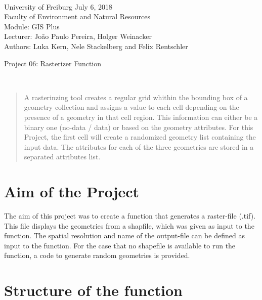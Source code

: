 \documentclass[10pt, a4paper]{article}
\begin{document}
\markboth{}
\\\noindent University of Freiburg \hspace{10cm}  July 6, 2018
\\Faculty of Environment and Natural Resources
\\Module: GIS Plus
\\Lecturer: João Paulo Pereira, Holger Weinacker
\\Authors: Luka Kern, Nele Stackelberg and Felix Rentschler
\\

\begin{center}
	\huge{Project 06: Rasterizer Function} \vspace{0.5cm}\\
\end{center}

\
\onehalfspacing %



\begin{abstract}
	A rasterinzing tool creates a regular grid whithin the bounding box of a geometry collection and assigns a value to each cell depending on the presence of a geometry in that cell region. This information can either be a binary one (no-data / data) or based on the geometry attributes. For this Project, the first cell will create a randomized geometry list containing the input data. The attributes for each of the three geometries are stored in a separated attributes list.
\end{abstract}


\section{Aim of the Project}
The aim of this project was to create a function that generates a raster-file (.tif). This file displays the geometries from a shapfile, which was given as input to the function. The spatial resolution and name of the output-file can be defined as input to the function.
For the case that no shapefile is available to run the function, a code to generate random geometries is provided.


\section{Structure of the function}
\end{document}
